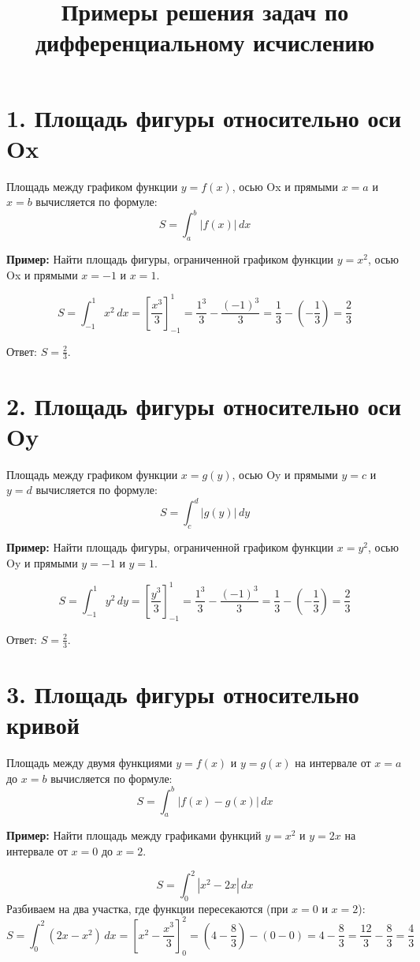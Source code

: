 \documentclass{article}
\begin{document}
\title{Примеры решения задач по дифференциальному исчислению}
\author{}
\date{}
\section*{1. Площадь фигуры относительно оси Ox}



Площадь между графиком функции \( y = f(x) \), осью Ox и прямыми \( x = a \) и \( x = b \) вычисляется по формуле:
\[
S = \int_{a}^{b} |f(x)| \, dx
\]

\textbf{Пример:} Найти площадь фигуры, ограниченной графиком функции \( y = x^2 \), осью Ox и прямыми \( x = -1 \) и \( x = 1 \).

\[
S = \int_{-1}^{1} x^2 \, dx = \left[ \frac{x^3}{3} \right]_{-1}^{1} = \frac{1^3}{3} - \frac{(-1)^3}{3} = \frac{1}{3} - \left( -\frac{1}{3} \right) = \frac{2}{3}
\]

Ответ: \( S = \frac{2}{3} \).

\section*{2. Площадь фигуры относительно оси Oy}
Площадь между графиком функции \( x = g(y) \), осью Oy и прямыми \( y = c \) и \( y = d \) вычисляется по формуле:
\[
S = \int_{c}^{d} |g(y)| \, dy
\]

\textbf{Пример:} Найти площадь фигуры, ограниченной графиком функции \( x = y^2 \), осью Oy и прямыми \( y = -1 \) и \( y = 1 \).

\[
S = \int_{-1}^{1} y^2 \, dy = \left[ \frac{y^3}{3} \right]_{-1}^{1} = \frac{1^3}{3} - \frac{(-1)^3}{3} = \frac{1}{3} - \left( -\frac{1}{3} \right) = \frac{2}{3}
\]

Ответ: \( S = \frac{2}{3} \).

\section*{3. Площадь фигуры относительно кривой}
Площадь между двумя функциями \( y = f(x) \) и \( y = g(x) \) на интервале от \( x = a \) до \( x = b \) вычисляется по формуле:
\[
S = \int_{a}^{b} |f(x) - g(x)| \, dx
\]

\textbf{Пример:} Найти площадь между графиками функций \( y = x^2 \) и \( y = 2x \) на интервале от \( x = 0 \) до \( x = 2 \).

\[
S = \int_{0}^{2} |x^2 - 2x| \, dx
\]
Разбиваем на два участка, где функции пересекаются (при \( x = 0 \) и \( x = 2 \)):
\[
S = \int_{0}^{2} (2x - x^2) \, dx = \left[ x^2 - \frac{x^3}{3} \right]_{0}^{2} = (4 - \frac{8}{3}) - (0 - 0) = 4 - \frac{8}{3} = \frac{12}{3} - \frac{8}{3} = \frac{4}{3}
\]
\end{document}
